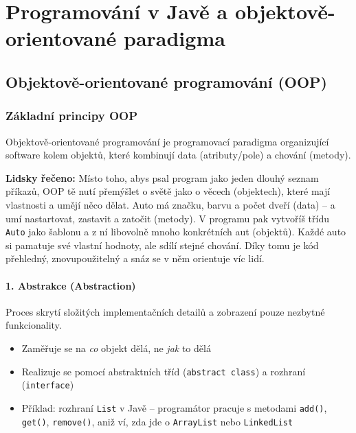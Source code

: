 \section{Programování v Javě a objektově-orientované paradigma}

\subsection{Objektově-orientované programování (OOP)}

\subsubsection{Základní principy OOP}

Objektově-orientované programování je programovací paradigma organizující software kolem objektů,
které kombinují data (atributy/pole) a chování (metody).

\textbf{Lidsky řečeno:} Místo toho, abys psal program jako jeden dlouhý seznam příkazů, OOP tě nutí přemýšlet o světě jako o věcech (objektech), které mají vlastnosti a umějí něco dělat. Auto má značku, barvu a počet dveří (data) -- a umí nastartovat, zastavit a zatočit (metody). V programu pak vytvoříš třídu \texttt{Auto} jako šablonu a z ní libovolně mnoho konkrétních aut (objektů). Každé auto si pamatuje své vlastní hodnoty, ale sdílí stejné chování. Díky tomu je kód přehledný, znovupoužitelný a snáz se v něm orientuje víc lidí.

\paragraph{1. Abstrakce (Abstraction)}
Proces skrytí složitých implementačních detailů a zobrazení pouze nezbytné funkcionality.
\begin{itemize}
  \item Zaměřuje se na \textit{co} objekt dělá, ne \textit{jak} to dělá
  \item Realizuje se pomocí abstraktních tříd (\texttt{abstract class}) a rozhraní (\texttt{interface})
  \item Příklad: rozhraní \texttt{List} v Javě -- programátor pracuje s metodami \texttt{add()}, \texttt{get()},
    \texttt{remove()}, aniž ví, zda jde o \texttt{ArrayList} nebo \texttt{LinkedList}
\end{itemize}

